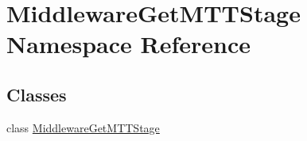 \hypertarget{namespace_middleware_get_m_t_t_stage}{\section{Middleware\-Get\-M\-T\-T\-Stage Namespace Reference}
\label{namespace_middleware_get_m_t_t_stage}
}
\subsection*{Classes}
\begin{DoxyCompactItemize}
\item 
class \hyperlink{class_middleware_get_m_t_t_stage_1_1_middleware_get_m_t_t_stage}{Middleware\-Get\-M\-T\-T\-Stage}
\end{DoxyCompactItemize}
